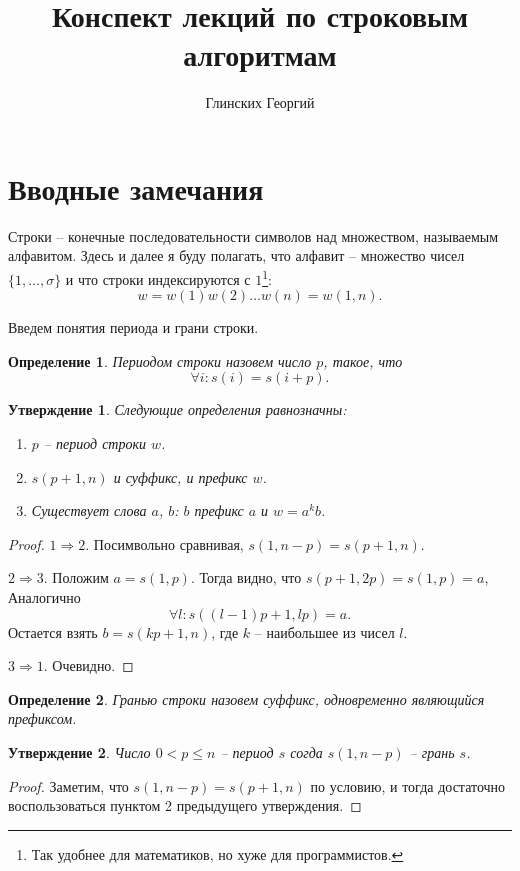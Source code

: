 \documentclass[letterpaper, 12pt]{article}
\author{Глинских Георгий}
\title{Конспект лекций по строковым алгоритмам}
\newtheorem{stm}{Утверждение}
\newtheorem{definition}{Определение}
\begin{document}
\maketitle

\section{Вводные замечания}

Строки -- конечные последовательности символов над множеством, называемым
алфавитом. Здесь и далее я буду полагать, что алфавит -- множество чисел
$\{1, \ldots, \sigma\}$ и что строки индексируются с $1$\footnote{Так
удобнее для математиков, но хуже для программистов.}:
$$w = w(1)w(2)\ldots{}w(n) = w(1,n).$$

Введем понятия периода и грани строки.
\begin{definition}
  \label{period_dfn}
  Периодом строки назовем число $p$, такое, что
  $$\forall i : s(i) = s(i + p).$$ 
\end{definition}

\begin{stm}
  Следующие определения равнозначны:
  \begin{enumerate}
    \item $p$ -- период строки $w$.
    \item $s(p + 1, n)$ и суффикс, и префикс $w$.
    \item Существует слова $a$, $b$: $b$ префикс $a$ и $w = a^k b$.
  \end{enumerate}
\end{stm}
\begin{proof}

$1 \Rightarrow 2$. Посимвольно сравнивая, $s(1, n-p) = s(p + 1, n)$.

$2 \Rightarrow 3$. Положим $a = s(1, p)$. Тогда видно, что
$s(p + 1,2p) = s(1,p) = a$,
Аналогично $$\forall l : s((l-1)p + 1, lp) = a.$$
Остается взять $b = s(kp + 1, n)$, где $k$ -- наибольшее из чисел $l$.

$3 \Rightarrow 1$. Очевидно.

\end{proof}

\begin{definition}
  \label{border_dfn}
  Гранью строки назовем суффикс, одновременно являющийся префиксом. 
\end{definition}

\begin{stm}
  Число $0 < p \le n$ -- период $s$ согда $s(1, n-p)$ -- грань $s$.
\end{stm}
\begin{proof}
  Заметим, что $s(1, n-p) = s(p + 1, n)$ по условию, и тогда достаточно
  воспользоваться пунктом 2 предыдущего утверждения.
\end{proof}
\end{document}
